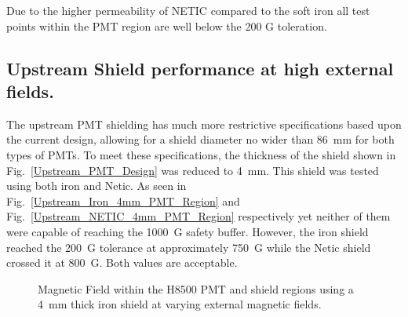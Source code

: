\documentclass[12pt]{article}
\begin{document}
Due to the higher permeability of NETIC compared to the soft iron all test points 
within the PMT region are well below the 200 G toleration.


\subsection{Upstream Shield performance at high external  fields.}
The upstream PMT shielding has much more restrictive specifications based 
upon the current design, allowing for a shield diameter no wider than 86~mm for both types of PMTs.
To meet these specifications, the thickness of the shield shown in Fig.~\ref{Upstream_PMT_Design} 
was reduced to 4~mm.
This shield was tested using both iron and Netic. 
As seen in Fig.~\ref{Upstream_Iron_4mm_PMT_Region}  and Fig.~\ref{Upstream_NETIC_4mm_PMT_Region} 
respectively yet neither of them  were capable of reaching the 1000~G safety buffer. 
However, the iron shield reached the 200~G tolerance at approximately 
750~G while the Netic shield crossed it at 800~G. Both values are acceptable.
%
\begin{figure}[ht]
\centering
{}
\qquad
{}
\caption{\small{Magnetic Field within the H8500 PMT and shield regions using a 4~mm thick iron shield at varying external magnetic fields.}}\label{Upstream_Iron_4mm}
\end{figure}
\end{document}
